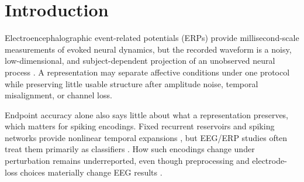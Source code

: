 \documentclass[conference]{IEEEtran}
\begin{document}
\section{Introduction}
Electroencephalographic event-related potentials (ERPs) provide millisecond-scale measurements of evoked neural dynamics, but the recorded waveform is a noisy, low-dimensional, and subject-dependent projection of an unobserved neural process \cite{makeig2002dynamic,blankertz2011singletrial}. A representation may separate affective conditions under one protocol while preserving little usable structure after amplitude noise, temporal misalignment, or channel loss.

Endpoint accuracy alone also says little about what a representation preserves, which matters for spiking encodings. Fixed recurrent reservoirs and spiking networks provide nonlinear temporal expansions \cite{maass2002real,lukosevicius2009reservoir}, but EEG/ERP studies often treat them primarily as classifiers \cite{gong2023sglnet,craik2019deep}. How such encodings change under perturbation remains underreported, even though preprocessing and electrode-loss choices materially change EEG results \cite{delpup2025preprocessing,chiang2023depression,guo2025mma}.
\end{document}
